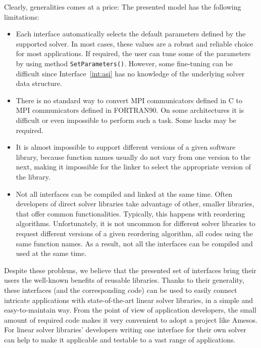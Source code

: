 \documentclass[acmtocl]{acmtrans2m}
\begin{document}
Clearly,  generalities comes at a price: The presented model has the following
limitations:
\begin{itemize}
\item 
Each interface automatically selects the default parameters defined by the
supported solver. In most cases, these values are a robust and reliable choice
for most applications. If required, the user can tune some of the parameters
by using method \verb!SetParameters()!. However, some fine-tuning can be
difficult since Interface~\ref{int:asi} has no knowledge of the underlying
solver data structure.

\item There
  is no standard way to 
  convert MPI communicators defined in C to MPI communicators defined
  in FORTRAN90. On some architectures it is difficult or even
  impossible to perform such a task. Some hacks may be required.

\item 
It is almost impossible to support different versions of a given software
library, because
function names usually do not vary from one version to the
next, making it impossible for the linker to select the
  appropriate version of the library.

\item 
Not all interfaces can be compiled and linked at the same time. Often
developers of direct solver libraries take advantage of other, smaller
libraries, that offer common functionalities. Typically, this happens with
reordering algorithms. Unfortunately,
it is not uncommon for different solver libraries to request different
versions of a given reordering algorithm, all codes using the same function
names. As a result, not all the interfaces can be compiled and used at the
same time.
\end{itemize}

%

Despite these problems, we believe that the presented set of interfaces
bring their users the well-known benefits of reusable libraries. Thanks to
their generality, these interfaces (and the corresponding code) can be used to
easily connect intricate applications with state-of-the-art linear solver
libraries, in a simple and easy-to-maintain way. From the point of view of
application developers, the small amount of required code makes it very
convenient to adopt a project like Amesos. For linear solver
libraries' developers  writing one interface for their own solver can help to make it
applicable and testable to a vast range of applications.
\end{document}
